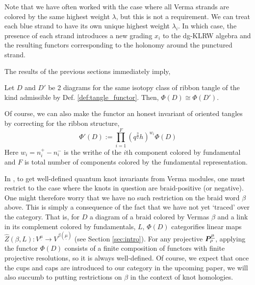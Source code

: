 \documentclass{article}
\begin{document}
\begin{rem}
    Note that we have often worked with the case where all Verma strands are colored by the same highest weight $\lambda$, but this is not a requirement. We can treat each blue strand to have its own unique highest weight $\lambda_i$. In which case, the presence of each strand introduces a new grading $x_i$ to the dg-KLRW algebra and the resulting functors corresponding to the holonomy around the punctured strand. 
\end{rem}
The results of the previous sections immediately imply, 

\begin{thm}
    Let $D$ and $D'$ be 2 diagrams for the same isotopy class of ribbon tangle of the kind admissible by Def. \ref{def:tangle_functor}. Then, $\Phi(D) \cong \Phi(D')$. 
\end{thm}

Of course, we can also make the functor an honest invariant of oriented tangles by correcting for the ribbon structure,
$$\Phi'(D) := \prod^F_{i=1}(q^{\frac{3}{2}}h)^{w_i} \Phi(D)$$
Here $w_i = n^+_i-n_i^-$ is the writhe of the $i$th component colored by fundamental and $F$ is total number of components colored by the fundamental representation. 

\begin{rem}
In \cite{Park}, to get well-defined quantum knot invariants from Verma modules, one must restrict to the case where the knots in question are braid-positive (or negative). One might therefore worry that we have no such restriction on the braid word $\beta$ above. This is simply a consequence of the fact that we have not yet `traced' over the category. That is, for $D$ a diagram of a braid colored by Vermas $\beta$ and a link in its complement colored by fundamentals, $L$, $\Phi(D)$ categorifies linear maps $\hat{Z}(\beta, L): V^{\underline{\mu}} \rightarrow V^{\beta(\underline{\mu})}$ (see Section \ref{sec:intro}). For any projective ${\boldsymbol{P}}^{\underline{\mu}}_\rho$, applying the functor $\Phi(D)$ consists of a finite composition of functors with finite projective resolutions, so it is always well-defined. Of course, we expect that once the cups and caps are introduced to our category in the upcoming paper, we will also succumb to putting restrictions on $\beta$ in the context of knot homologies. 
\end{rem}
\end{document}
